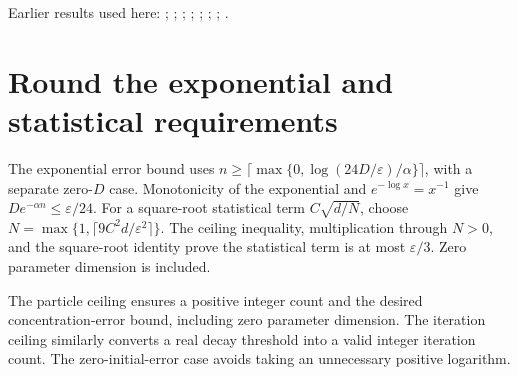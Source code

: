 \documentclass[11pt,a4paper]{article}
\begin{document}
Earlier results used here: \cite[Section~3.17.4]{LangevinLean2026ULASC}; \cite[Section~3.1.1]{LangevinLean2026IPLA}; \cite[Section~3.1.6]{LangevinLean2026IPLA}; \cite[Section~3.3.1]{LangevinLean2026IPLA}; \cite[Section~3.3.2]{LangevinLean2026IPLA}; \cite[Section~3.98.2]{LangevinLean2026Kinetic}; \cite[Section~3.98.4]{LangevinLean2026Kinetic}; \cite[Section~3.99.1]{LangevinLean2026Kinetic}.

\section{\texorpdfstring{Round the exponential and statistical requirements}{Round the exponential and statistical requirements}}


The exponential error bound uses \(n\ge\lceil\max\{0,\log(24D/\varepsilon)/\alpha\}\rceil\), with a separate zero-\(D\) case. Monotonicity of the exponential and \(e^{-\log x}=x^{-1}\) give \(De^{-\alpha n}\le\varepsilon/24\). For a square-root statistical term \(C\sqrt{d/N}\), choose \(N=\max\{1,\lceil9C^2d/\varepsilon^2\rceil\}\). The ceiling inequality, multiplication through \(N>0\), and the square-root identity prove the statistical term is at most \(\varepsilon/3\). Zero parameter dimension is included.



The particle ceiling ensures a positive integer count and the desired concentration-error bound, including zero parameter dimension. The iteration ceiling similarly converts a real decay threshold into a valid integer iteration count. The zero-initial-error case avoids taking an unnecessary positive logarithm.
\end{document}
